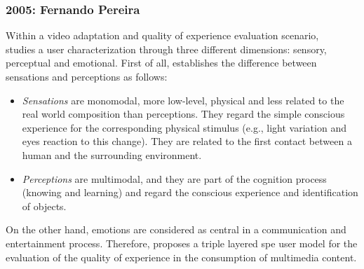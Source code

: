 \subsubsection{2005: Fernando Pereira}
\label{sec:pereira}

Within a video adaptation and quality of experience evaluation scenario,
~\citet{pereira_triple_2005} studies a user characterization through three
different dimensions: sensory, perceptual and emotional. First of all,
\citeauthor{pereira_triple_2005} establishes the difference between sensations 
and perceptions as follows:

\begin{itemize}
  \item \textit{Sensations} are monomodal, more low-level, physical and less 
  related to the real world composition than perceptions. They regard the simple 
  conscious experience for the corresponding physical stimulus (e.g., light 
  variation and eyes reaction to this change). They are related to the first 
  contact between a human and the surrounding environment.
  
  \item \textit{Perceptions} are multimodal, and they are part of the cognition 
  process (knowing and learning) and regard the conscious experience and 
  identification of objects.
\end{itemize}

On the other hand, emotions are considered as central in a communication and 
entertainment process. Therefore, \citeauthor{pereira_triple_2005} proposes a 
triple layered \ac{spe} user model for the evaluation of the quality of 
experience in the consumption of multimedia content.



